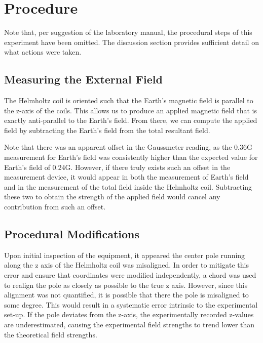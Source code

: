 \documentclass[a4paper]{article}
\begin{document}
\section{Procedure}

\qq Note that, per suggestion of the laboratory manual, the procedural steps of this
experiment have been omitted. The discussion section provides sufficient detail
on what actions were taken.

\subsection{Measuring the External Field}
\qq The Helmholtz coil is oriented such that the Earth's magnetic field is parallel
to the z-axis of the coils. This allows us to produce an applied magnetic field
that is exactly anti-parallel to the Earth's field. From there, we can compute
the applied field by subtracting the Earth's field from the total resultant
field.

\qq Note that there was an apparent offset in the Gaussmeter reading, as the 0.36G
measurement for Earth's field was consistently higher than the expected value
for Earth's field of 0.24G. However, if there truly exists such an offset in the
measurement device, it would appear in both the measurement of Earth's field and
in the measurement of the total field inside the Helmholtz coil. Subtracting
these two to obtain the strength of the applied field would cancel any
contribution from such an offset.

\subsection{Procedural Modifications}

\qq Upon initial inspection of the equipment, it appeared the center pole running
along the z axis of the Helmholtz coil was misaligned. In order to mitigate this
error and ensure that coordinates were modified independently, a chord was used
to realign the pole as closely as possible to the true z axis. However, since
this alignment was not quantified, it is possible that there the pole is
misaligned to some degree. This would result in a systematic error intrinsic to
the experimental set-up. If the pole deviates from the z-axis, the
experimentally recorded z-values are underestimated, causing the experimental
field strengths to trend lower than the theoretical field strengths.
\end{document}
